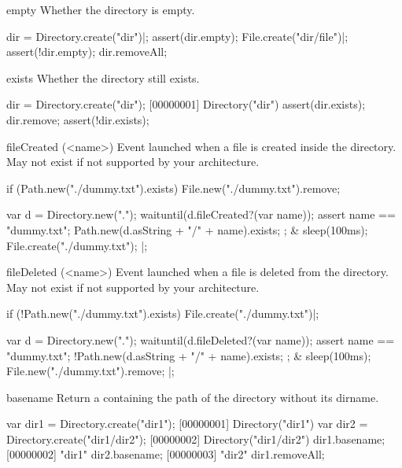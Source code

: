 \begin{urbiscriptapi}
\item[empty]
  Whether the directory is empty.
\begin{urbiscript}
dir = Directory.create("dir")|;
assert(dir.empty);
File.create("dir/file")|;
assert(!dir.empty);
dir.removeAll;
\end{urbiscript}

\item[exists]
  Whether the directory still exists.
\begin{urbiscript}
dir = Directory.create("dir");
[00000001] Directory("dir")
assert(dir.exists);
dir.remove;
assert(!dir.exists);
\end{urbiscript}

\item[fileCreated](<name>)%
  Event launched when a file is created inside the directory.
  May not exist if not supported by your architecture.

\begin{urbiscript}[firstnumber=1]
if (Path.new("./dummy.txt").exists)
  File.new("./dummy.txt").remove;

  {
    var d = Directory.new(".");
    waituntil(d.fileCreated?(var name));
    assert
    {
      name == "dummy.txt";
      Path.new(d.asString + "/" + name).exists;
    };
  }
&
  {
    sleep(100ms);
    File.create("./dummy.txt");
  }|;
\end{urbiscript}

\item[fileDeleted](<name>)%
  Event launched when a file is deleted from the directory.  May not exist
  if not supported by your architecture.

\begin{urbiscript}
if (!Path.new("./dummy.txt").exists)
  File.create("./dummy.txt")|;

  {
    var d = Directory.new(".");
    waituntil(d.fileDeleted?(var name));
    assert
    {
      name == "dummy.txt";
      !Path.new(d.asString + "/" + name).exists;
    };
  }
&
  {
    sleep(100ms);
    File.new("./dummy.txt").remove;
  }|;
\end{urbiscript}

\item[basename]
  Return a  containing the path of the directory without
  its dirname.
\begin{urbiscript}
var dir1 = Directory.create("dir1");
[00000001] Directory("dir1")
var dir2 = Directory.create("dir1/dir2");
[00000002] Directory("dir1/dir2")
dir1.basename;
[00000002] "dir1"
dir2.basename;
[00000003] "dir2"
dir1.removeAll;
\end{urbiscript}


\end{urbiscriptapi}
